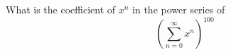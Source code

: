 What is the coefficient of $x^n$ in the power series of
\[
\left( \sum_{n=0}^\infty x^n \right)^{100} 
\]
